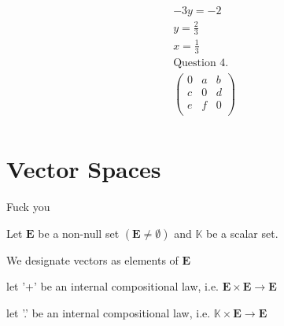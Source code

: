 \documentclass{article}
\begin{document}
\begin{align*}
    -3y = -2                                   \\
    y = \frac{2}{3}                            \\
    x = \frac{1}{3}                            \\
    \textrm{Question 4.}                       \\
    \begin{pmatrix}
        0 & a & b \\
        c & 0 & d \\
        e & f & 0 \\
    \end{pmatrix}                             \\
\end{align*}

\section{Vector Spaces}

Fuck you

Let $\mathbf{E}$ be a non-null set $ (\mathbf{E} \neq \emptyset) $ and $ \mathbb{K}$ be a scalar set.

We designate vectors as elements of $\mathbf{E}$

let '+' be an internal compositional law, i.e. $ \mathbf{E} \times \mathbf{E} \rightarrow \mathbf{E}$

let '.' be an internal compositional law, i.e. $ \mathbb{K} \times \mathbf{E} \rightarrow \mathbf{E}$
\end{document}

